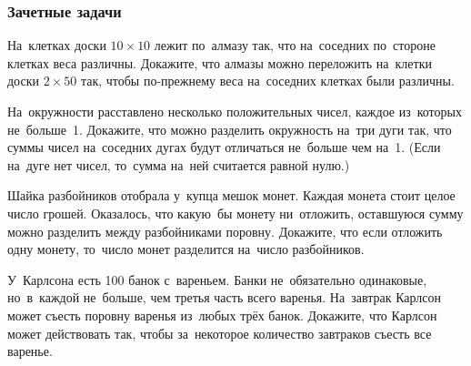 \subsubsection*{Зачетные задачи}

\begin{problems}

\item
На~клетках доски $10 \times 10$ лежит по~алмазу так, что на~соседних по~стороне
клетках веса различны.
Докажите, что алмазы можно переложить на~клетки доски $2 \times 50$ так, чтобы
по-прежнему веса на~соседних клетках были различны.

\item
На~окружности расставлено несколько положительных чисел, каждое из~которых
не~больше~1.
Докажите, что можно разделить окружность на~три дуги так, что суммы чисел
на~соседних дугах будут отличаться не~больше чем на~1.
(Если на~дуге нет чисел, то~сумма на~ней считается равной нулю.)


\item
Шайка разбойников отобрала у~купца мешок монет.
Каждая монета стоит целое число грошей.
Оказалось, что какую~бы монету ни~отложить, оставшуюся сумму можно разделить
между разбойниками поровну.
Докажите, что если отложить одну монету, то~число монет разделится на~число
разбойников.

\item
У~Карлсона есть 100 банок с~вареньем.
Банки не~обязательно одинаковые, но~в~каждой не~больше, чем третья часть всего
варенья.
На~завтрак Карлсон может съесть поровну варенья из~любых трёх банок.
Докажите, что Карлсон может действовать так, чтобы за~некоторое количество
завтраков съесть все варенье.

\end{problems}


